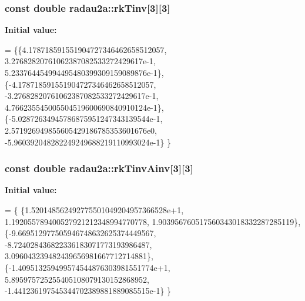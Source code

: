 \subsubsection[{\texorpdfstring{rk\+Tinv}{rkTinv}}]{\setlength{\rightskip}{0pt plus 5cm}const double radau2a\+::rk\+Tinv\mbox{[}3\mbox{]}\mbox{[}3\mbox{]}\hspace{0.3cm}{\ttfamily [static]}}\hypertarget{group__RK__Params_ga967c2bc749d9b8cda1585bf4ee50b1c1}{}\label{group__RK__Params_ga967c2bc749d9b8cda1585bf4ee50b1c1}
{\bfseries Initial value\+:}
\begin{DoxyCode}
=
\{\{4.178718591551904727346462658512057,
3.27682820761062387082533272429617e-1,
5.233764454994495480399309159089876e-1\},
\{-4.178718591551904727346462658512057,
-3.27682820761062387082533272429617e-1,
4.766235545005504519600690840910124e-1\},
\{-5.02872634945786875951247343139544e-1,
2.571926949855605429186785353601676e0,
-5.960392048282249249688219110993024e-1\}
\}
\end{DoxyCode}
\subsubsection[{\texorpdfstring{rk\+Tinv\+Ainv}{rkTinvAinv}}]{\setlength{\rightskip}{0pt plus 5cm}const double radau2a\+::rk\+Tinv\+Ainv\mbox{[}3\mbox{]}\mbox{[}3\mbox{]}\hspace{0.3cm}{\ttfamily [static]}}\hypertarget{group__RK__Params_ga048232e984719eb1fed3f8ba7fb4c25b}{}\label{group__RK__Params_ga048232e984719eb1fed3f8ba7fb4c25b}
{\bfseries Initial value\+:}
\begin{DoxyCode}
= \{
\{1.520148562492775501049204957366528e+1,
1.192055789400527921212348994770778,
1.903956760517560343018332287285119\},
\{-9.669512977505946748632625374449567,
-8.724028436822336183071773193986487,
3.096043239482439656981667712714881\},
\{-1.409513259499574544876303981551774e+1,
5.895975725255405108079130152868952,
-1.441236197545344702389881889085515e-1\}
\}
\end{DoxyCode}
